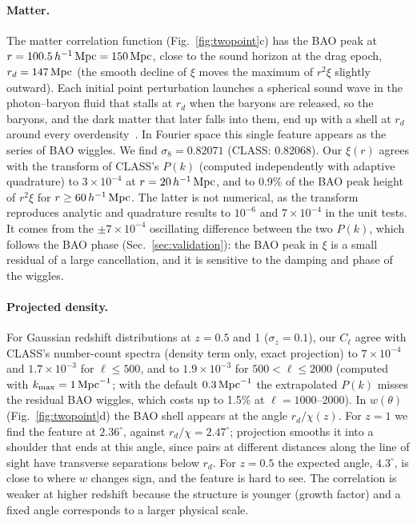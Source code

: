 \paragraph*{Matter.} The matter correlation function (Fig.~\ref{fig:twopoint}c) has the BAO peak at
$r=100.5\,h^{-1}\,\mathrm{Mpc}=150\,\mathrm{Mpc}$, close to the sound horizon at the drag epoch, $r_d=147\,\mathrm{Mpc}$ (the smooth decline of
$\xi$ moves the maximum of $r^2\xi$ slightly outward). Each initial point perturbation launches a spherical sound wave
in the photon--baryon fluid that stalls at $r_d$ when the baryons are released, so the baryons, and the dark matter
that later falls into them, end up with a shell at $r_d$ around every overdensity~\cite{Eisenstein2005}. In Fourier
space this single feature appears as the series of BAO wiggles. We find $\sigma_8=0.82071$ (CLASS: 0.82068). Our
$\xi(r)$ agrees with the transform of CLASS's $P(k)$ (computed independently with adaptive quadrature) to
$3\times10^{-4}$ at $r=20\,h^{-1}\,\mathrm{Mpc}$, and to 0.9\% of the BAO peak height of $r^2\xi$ for $r\ge60\,h^{-1}\,\mathrm{Mpc}$. The
latter is not numerical, as the transform reproduces analytic and quadrature results to $10^{-6}$ and $7\times10^{-4}$ in
the unit tests. It comes from the $\pm7\times10^{-4}$ oscillating difference between the two $P(k)$, which follows
the BAO phase (Sec.~\ref{sec:validation}): the BAO peak in $\xi$ is a small residual of a large cancellation, and it is
sensitive to the damping and phase of the wiggles.

\paragraph*{Projected density.} For Gaussian redshift distributions at $z=0.5$ and 1 ($\sigma_z=0.1$), our $C_\ell$ agree
with CLASS's number-count spectra (density term only, exact projection) to $7\times10^{-4}$ and $1.7\times10^{-3}$ for
$\ell\le500$, and to $1.9\times10^{-3}$ for $500<\ell\le2000$ (computed with $k_{\max}=1\,\mathrm{Mpc}^{-1}$; with the default
$0.3\,\mathrm{Mpc}^{-1}$ the extrapolated $P(k)$ misses the residual BAO wiggles, which costs up to 1.5\% at $\ell=1000$--2000). In $w(\theta)$
(Fig.~\ref{fig:twopoint}d) the BAO shell appears at the angle $r_d/\chi(z)$. For $z=1$ we find the feature at
$2.36^\circ$, against $r_d/\chi=2.47^\circ$; projection smooths it into a shoulder that ends at this angle, since pairs
at different distances along the line of sight have transverse separations below $r_d$. For $z=0.5$ the expected angle,
$4.3^\circ$, is close to where $w$ changes sign, and the feature is hard to see. The correlation is weaker at higher
redshift because the structure is younger (growth factor) and a fixed angle corresponds to a larger physical scale.
